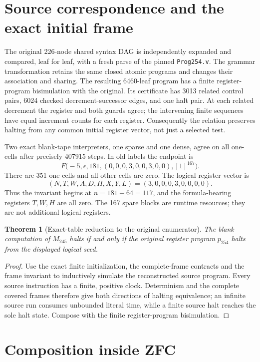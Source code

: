 \documentclass[11pt]{article}
\newtheorem{theorem}[lemma]{Theorem}
\begin{document}
\section{Source correspondence and the exact initial frame}

The original 226-node shared syntax DAG is independently expanded and
compared, leaf for leaf, with a fresh parse of the pinned
\texttt{Prog254.v}. The grammar transformation retains the same closed
atomic programs and changes their association and sharing. The resulting
6460-leaf program has a finite register-program bisimulation with the
original. Its certificate has 3013 related control pairs, 6024 checked
decrement-successor edges, and one halt pair. At each related decrement the
register and both guards agree; the intervening finite sequences have equal
increment counts for each register. Consequently the relation preserves
halting from any common initial register vector, not just a selected test.

Two exact blank-tape interpreters, one sparse and one dense, agree on all
one-cells after precisely 407915 steps. In old labels the endpoint is
\[
 F\bigl(-5,\epsilon,181,
 (0,0,0,3,0,0,3,0,0),[1]^{167}\bigr).
\]
There are 351 one-cells and all other cells are zero. The logical register
vector is
\[
 (N,T,W,A,D,H,X,Y,L)=(3,0,0,0,3,0,0,0,0).
\]
Thus the invariant begins at $n=181-64=117$, and the formula-bearing
registers $T,W,H$ are all zero. The 167 spare blocks are runtime resources;
they are not additional logical registers.

\begin{theorem}[Exact-table reduction to the original enumerator]
The blank computation of $M_{245}$ halts if and only if the original
register program $p_{254}$ halts from the displayed logical seed.
\end{theorem}
\begin{proof}
Use the exact finite initialization, the complete-frame contracts and the
frame invariant to inductively simulate the reconstructed source program.
Every source instruction has a finite, positive clock. Determinism and the
complete covered frames therefore give both directions of halting
equivalence; an infinite source run consumes unbounded literal time, while
a finite source halt reaches the sole halt state. Compose with the finite
register-program bisimulation.
\end{proof}

\section{Composition inside ZFC}
\end{document}
